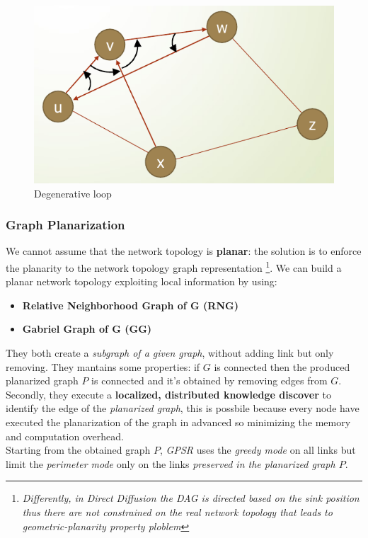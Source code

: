 \documentclass[10pt,a4paper]{report}
\theoremstyle{definition}
\begin{document}
\begin{figure}[h]
	\centering\includegraphics[scale=0.50]{images/Pasted image 20230523152038.png}
	\caption{Degenerative loop }
	\label{not-planar-degeneration-tour}
\end{figure}



\subsubsection{Graph Planarization}\label{sec:graph-planarization}
We cannot assume that the network topology is \textbf{planar}: the solution is to enforce the planarity to the network topology graph representation \footnote{\textit{Differently, in Direct Diffusion the DAG is directed based on the sink position thus there are not constrained on the real network topology that leads to geometric-planarity property ploblem}}.
We can build a planar network topology exploiting local information by using:
\begin{itemize}
	\item 
	\textbf{Relative Neighborhood Graph of G (RNG)}
	\item 
	\textbf{Gabriel Graph of G (GG)}
\end{itemize}
They both create a \textit{subgraph of a given graph}, without adding link but only removing.
They mantains some properties: if $G$ is connected then the produced planarized graph $P$ is connected and it's obtained by removing edges from $G$.\\
Secondly, they execute a \textbf{localized, distributed knowledge discover} to identify the edge of the \textit{planarized graph}, this is possbile because every node have executed the planarization of the graph in advanced so minimizing the memory and computation overhead.\\
Starting from the obtained graph $P$, \textit{GPSR} uses the \textit{greedy mode} on all links but limit the \textit{perimeter mode} only on the links \textit{preserved in the planarized graph $P$}.
\end{document}
